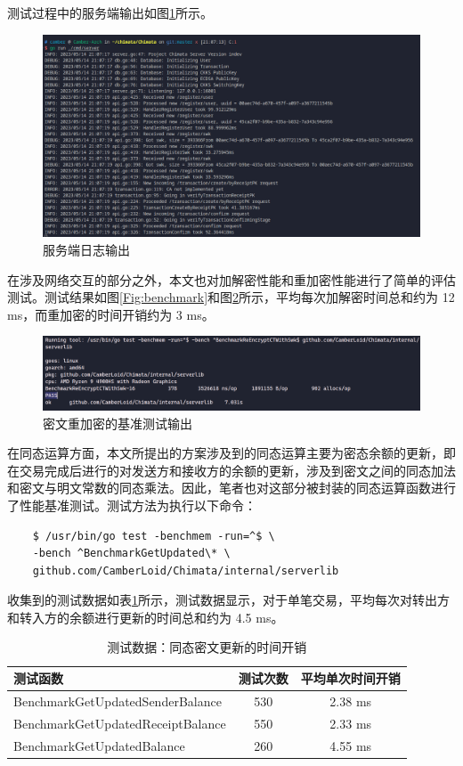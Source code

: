 测试过程中的服务端输出如图\ref{Fig:server}所示。

\begin{figure}
    \centering
    \includegraphics[width=0.8\linewidth]{./Figures/Server_ReceiptPK.png}
    \caption{服务端日志输出}\label{Fig:server}
\end{figure}

在涉及网络交互的部分之外，本文也对加解密性能和重加密性能进行了简单的评估测试。测试结果如图\ref{Fig:benchmark}和图\ref{Fig:bench_reencrypt}所示，平均每次加解密时间总和约为 12 ms，而重加密的时间开销约为 3 ms。

\begin{figure}[h]
    \centering
    \includegraphics[width=0.8\linewidth]{./Figures/Bench_ReEncrypt.png}
    \caption{密文重加密的基准测试输出}\label{Fig:bench_reencrypt}
\end{figure}

在同态运算方面，本文所提出的方案涉及到的同态运算主要为密态余额的更新，即在交易完成后进行的对发送方和接收方的余额的更新，涉及到密文之间的同态加法和密文与明文常数的同态乘法。因此，笔者也对这部分被封装的同态运算函数进行了性能基准测试。测试方法为执行以下命令：

\begin{verbatim}
    $ /usr/bin/go test -benchmem -run=^$ \
    -bench ^BenchmarkGetUpdated\* \
    github.com/CamberLoid/Chimata/internal/serverlib
\end{verbatim}

收集到的测试数据如表\ref{Tab:CTUpdate}所示，测试数据显示，对于单笔交易，平均每次对转出方和转入方的余额进行更新的时间总和约为 4.5 ms。

\begin{table}[h]
    \centering
    \begin{tabular}{|l|c|c|}
        \hline
        测试函数 & 测试次数 & 平均单次时间开销 \\
        \hline
        BenchmarkGetUpdatedSenderBalance & 530 & 2.38 ms \\
        \hline
        BenchmarkGetUpdatedReceiptBalance & 550 & 2.33 ms \\
        \hline
        BenchmarkGetUpdatedBalance & 260 & 4.55 ms \\
        \hline
    \end{tabular}
    \caption{测试数据：同态密文更新的时间开销} \label{Tab:CTUpdate}
\end{table}

